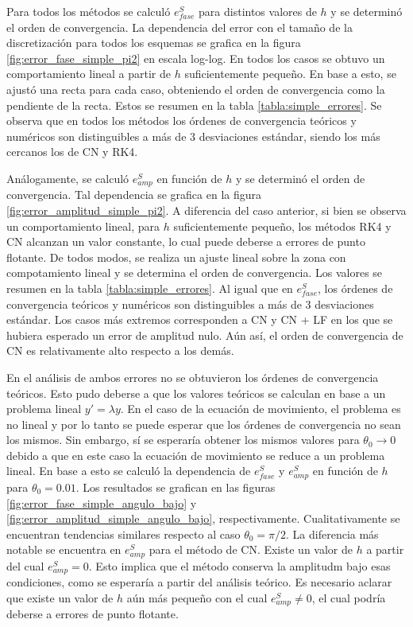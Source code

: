 \documentclass[aps,prb,twocolumn,superscriptaddress,floatfix,longbibliography]{revtex4-2}
\newcounter{para}
\begin{document}
Para todos los métodos se calculó $e^S_{fase}$ para distintos valores de $h$ y se determinó el orden de convergencia. La dependencia del error con el tamaño de la discretización para todos los esquemas se grafica en la figura \ref{fig:error_fase_simple_pi2} en escala log-log. En todos los casos se obtuvo un comportamiento lineal a partir de $h$ suficientemente pequeño. En base a esto, se ajustó una recta para cada caso, obteniendo el orden de convergencia como la pendiente de la recta. Estos se resumen en la tabla \ref{tabla:simple_errores}. Se observa que en todos los métodos los órdenes de convergencia teóricos y numéricos son distinguibles a más de 3 desviaciones estándar, siendo los más cercanos los de CN y RK4.


Análogamente, se calculó $e^S_{amp}$ en función de $h$ y se determinó el orden de convergencia. Tal dependencia se grafica en la figura \ref{fig:error_amplitud_simple_pi2}. A diferencia del caso anterior, si bien se observa un comportamiento lineal, para $h$ suficientemente pequeño, los métodos RK4 y CN alcanzan un valor constante, lo cual puede deberse a errores de punto flotante. De todos modos, se realiza un ajuste lineal sobre la zona con compotamiento lineal y se determina el orden de convergencia. Los valores se resumen en la tabla \ref{tabla:simple_errores}. Al igual que en $e^S_{fase}$, los órdenes de convergencia teóricos y numéricos son distinguibles a más de 3 desviaciones estándar. Los casos más extremos corresponden a CN y CN + LF en los que se hubiera esperado un error de amplitud nulo. Aún así, el orden de convergencia de CN es relativamente alto respecto a los demás.


En el análisis de ambos errores no se obtuvieron los órdenes de convergencia teóricos. Esto pudo deberse a que los valores teóricos se calculan en base a un problema lineal $y' = \lambda y$. En el caso de la ecuación de movimiento, el problema es no lineal y por lo tanto se puede esperar que los órdenes de convergencia no sean los mismos. Sin embargo, sí se esperaría obtener los mismos valores para $\theta_0 \rightarrow 0$ debido a que en este caso la ecuación de movimiento se reduce a un problema lineal. En base a esto se calculó la dependencia de $e^S_{fase}$ y $e^S_{amp}$ en función de $h$ para $\theta_0 = 0.01$. Los resultados se grafican en las figuras \ref{fig:error_fase_simple_angulo_bajo} y \ref{fig:error_amplitud_simple_angulo_bajo}, respectivamente. Cualitativamente se encuentran tendencias similares respecto al caso $\theta_0 = \pi/2$. La diferencia más notable se encuentra en $e^S_{amp}$ para el método de CN. Existe un valor de $h$ a partir del cual $e^S_{amp} = 0$. Esto implica que el método conserva la amplitudm bajo esas condiciones, como se esperaría a partir del análisis teórico. Es necesario aclarar que existe un valor de $h$ aún más pequeño con el cual $e^S_{amp} \neq 0$, el cual podría deberse a errores de punto flotante.
\end{document}
